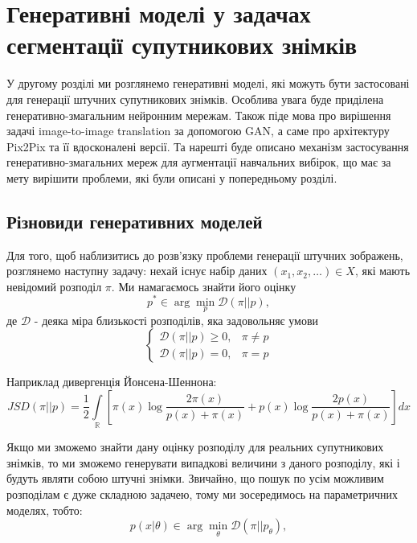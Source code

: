 \chapter{Генеративні моделі у задачах сегментації супутникових знімків}
\label{chap:gans}

У другому розділі ми розглянемо генеративні моделі, які можуть
бути застосовані для генерації штучних супутникових знімків.
Особлива увага буде приділена генеративно-змагальним нейронним
мережам. Також піде мова про вирішення задачі image-to-image translation
за допомогою GAN, а саме про архітектуру Pix2Pix та її вдосконалені версії.
Та нарешті буде описано механізм застосування генеративно-змагальних мереж
для аугментації навчальних вибірок, що має за мету вирішити проблеми, які
були описані у попередньому розділі.

\section{Різновиди генеративних моделей}

Для того, щоб наблизитись до розв'язку проблеми генерації
штучних зображень,
розглянемо наступну задачу:
нехай існує набір даних $(x_1, x_2, \dots) \in X$,
які мають невідомий розподіл $\pi$.
Ми намагаємось знайти його оцінку
$$p^* \in \arg \min\limits_{p} \mathcal{D}(\pi || p),$$
де $\mathcal{D}$ - деяка
міра близькості розподілів, яка задовольняє умови
\begin{equation*}
    \begin{cases}
        \mathcal{D}(\pi || p) \geq 0, & \pi \neq p \\
        \mathcal{D}(\pi || p) = 0,    & \pi = p
    \end{cases}
\end{equation*}

Наприклад дивергенція Йонсена-Шеннона:
\begin{equation} \label{eq:jsd}
    JSD(\pi || p) = \frac{1}{2} \int\limits_{\mathbb{R}}
    \left[
        \pi(x) \log \frac{2\pi(x)}{p(x) + \pi(x)} +
        p(x) \log \frac{2p(x)}{p(x) + \pi(x)}
        \right] dx
\end{equation}

Якщо ми зможемо знайти дану оцінку розподілу для
реальних супутникових знімків, то ми зможемо
генерувати випадкові величини з даного розподілу, які
і будуть являти собою штучні знімки. Звичайно, що
пошук по усім можливим розподілам є дуже складною задачею,
тому ми зосередимось на параметричних моделях, тобто:
$$p(x | \theta) \in \arg \min\limits_{\theta} \mathcal{D}(\pi || p_\theta),$$

